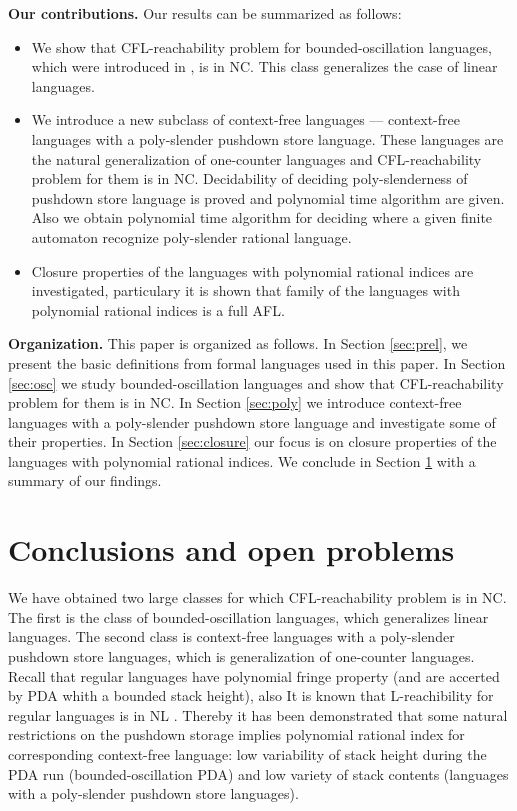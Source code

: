 \documentclass[smallextended]{svjour3}       %
\begin{document}
\textbf{Our contributions.} Our results can be summarized as follows:
\begin{itemize}
\item We show that CFL-reachability problem for bounded-oscillation languages, which were introduced in \cite{BoundOsc}, is in NC. This class generalizes the case of linear languages.
\item We introduce a new subclass of context-free languages --- context-free languages with a poly-slender pushdown store language. These languages are the natural generalization of one-counter languages and CFL-reachability problem for them is in NC. Decidability of deciding poly-slenderness of pushdown store language is proved and polynomial time algorithm are given. Also we obtain polynomial time algorithm for deciding where a given finite automaton recognize poly-slender rational language.  
\item Closure properties of the languages with polynomial rational indices are investigated, particulary it is shown that family of the languages with polynomial rational indices is a full AFL.
\end{itemize}


\textbf{Organization.} This paper is organized as follows. In Section \ref{sec:prel}, we present the basic definitions from formal languages used in this paper. In Section \ref{sec:osc} we study bounded-oscillation languages and show that CFL-reachability problem for them is in NC. In Section \ref{sec:poly} we introduce context-free languages with a poly-slender pushdown store language and investigate some of their properties. In Section \ref{sec:closure} our focus is on closure properties of the languages with polynomial rational indices. We conclude in Section \ref{sec:conc} with a summary of our findings.




\section{Conclusions and open problems}
\label{sec:conc}
We have obtained two large classes for which CFL-reachability problem is in NC. The first is the class of bounded-oscillation languages, which generalizes linear languages. The second class is 
context-free languages with a poly-slender pushdown store languages, which is generalization of one-counter languages. Recall that regular languages have polynomial fringe property (and are accerted by PDA whith a bounded stack height), also It is known that L-reachibility for regular languages is in NL \cite*{LReach, Yannakakis}. Thereby it has been demonstrated that some natural restrictions on the pushdown storage implies polynomial rational index for corresponding context-free language: low variability of stack height during the PDA run (bounded-oscillation PDA) and low variety of stack contents (languages with a poly-slender pushdown store languages). 
\end{document}
